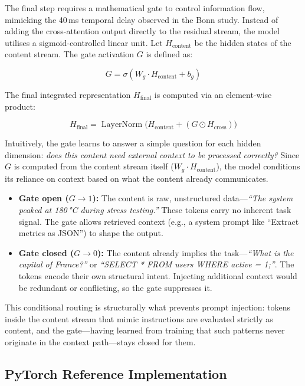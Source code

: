\documentclass[11pt,a4paper]{article}
\theoremstyle{definition}
\DeclareMathOperator{\LayerNorm}{LayerNorm}
\begin{document}
The final step requires a mathematical gate to control information flow, mimicking the 40\,ms temporal delay observed in the Bonn study. Instead of adding the cross-attention output directly to the residual stream, the model utilises a sigmoid-controlled linear unit. Let $H_{\text{content}}$ be the hidden states of the content stream. The gate activation $G$ is defined as:

\begin{equation}\label{eq:gate}
  G = \sigma(W_g \cdot H_{\text{content}} + b_g)
\end{equation}

The final integrated representation $H_{\text{final}}$ is computed via an element-wise product:

\begin{equation}\label{eq:final}
  H_{\text{final}} = \LayerNorm\!\big(H_{\text{content}} + (G \odot H_{\text{cross}})\big)
\end{equation}

Intuitively, the gate learns to answer a simple question for each hidden dimension: \emph{does this content need external context to be processed correctly?} Since $G$ is computed from the content stream itself ($W_g \cdot H_{\text{content}}$), the model conditions its reliance on context based on what the content already communicates.

\begin{itemize}
  \item \textbf{Gate open ($G \to 1$):} The content is raw, unstructured data---\emph{``The system peaked at 180\,°C during stress testing.''} These tokens carry no inherent task signal. The gate allows retrieved context (e.g., a system prompt like ``Extract metrics as JSON'') to shape the output.
  \item \textbf{Gate closed ($G \to 0$):} The content already implies the task---\emph{``What is the capital of France?''} or \emph{``SELECT * FROM users WHERE active = 1;''}. The tokens encode their own structural intent. Injecting additional context would be redundant or conflicting, so the gate suppresses it.
\end{itemize}

This conditional routing is structurally what prevents prompt injection: tokens inside the content stream that mimic instructions are evaluated strictly as content, and the gate---having learned from training that such patterns never originate in the context path---stays closed for them.

\subsection{PyTorch Reference Implementation}
\end{document}
